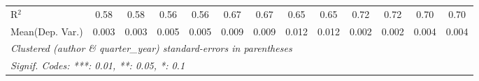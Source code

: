 \begin{tabular}{lcccccccccccc}
   R$^2$                                    & 0.58          & 0.58           & 0.56     & 0.56         & 0.67    & 0.67          & 0.65    & 0.65         & 0.72     & 0.72      & 0.70    & 0.70\\  
Mean(Dep. Var.) & 0.003 & 0.003 & 0.005 & 0.005 & 0.009 & 0.009 & 0.012 & 0.012 & 0.002 & 0.002 & 0.004 & 0.004 \\
   \midrule \midrule
   \multicolumn{13}{l}{\emph{Clustered (author \& quarter\_year) standard-errors in parentheses}}\\
   \multicolumn{13}{l}{\emph{Signif. Codes: ***: 0.01, **: 0.05, *: 0.1}}\\
\end{tabular}
\par\endgroup

